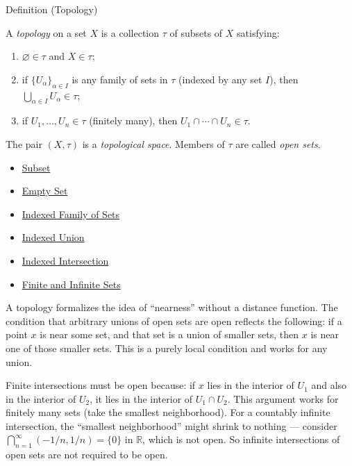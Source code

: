 \begin{definitionbox}{Definition (Topology)}
\begin{definition}[Topology]\label{def:topology-defn}
A \emph{topology} on a set $X$ is a collection $\tau$ of subsets of $X$
satisfying:
\begin{enumerate}[label=(\roman*)]
\item $\varnothing \in \tau$ and $X \in \tau$;
\item if $\{U_\alpha\}_{\alpha \in I}$ is any family of sets in $\tau$ (indexed
  by any set $I$), then $\bigcup_{\alpha \in I} U_\alpha \in \tau$;
\item if $U_1, \dots, U_n \in \tau$ (finitely many), then $U_1 \cap \cdots
  \cap U_n \in \tau$.
\end{enumerate}
The pair $(X, \tau)$ is a \emph{topological space}. Members of $\tau$ are
called \emph{open sets}.
\end{definition}
\end{definitionbox}

\begin{dependencies}
\begin{itemize}
  \item \hyperref[def:subset]{Subset}
  \item \hyperref[def:empty-set]{Empty Set}
  \item \hyperref[def:indexed-family]{Indexed Family of Sets}
  \item \hyperref[def:indexed-union]{Indexed Union}
  \item \hyperref[def:indexed-intersection]{Indexed Intersection}
  \item \hyperref[def:finite-infinite]{Finite and Infinite Sets}
\end{itemize}
\end{dependencies}

\begin{remark*}
A topology formalizes the idea of ``nearness'' without a distance function.
The condition that arbitrary unions of open sets are open reflects the
following: if a point $x$ is near some set, and that set is a union of smaller
sets, then $x$ is near one of those smaller sets. This is a purely local
condition and works for any union.

Finite intersections must be open because: if $x$ lies in the interior of
$U_1$ and also in the interior of $U_2$, it lies in the interior of $U_1 \cap
U_2$. This argument works for finitely many sets (take the smallest
neighborhood). For a countably infinite intersection, the ``smallest
neighborhood'' might shrink to nothing — consider $\bigcap_{n=1}^\infty
(-1/n, 1/n) = \{0\}$ in $\mathbb{R}$, which is not open. So infinite
intersections of open sets are not required to be open.
\end{remark*}

